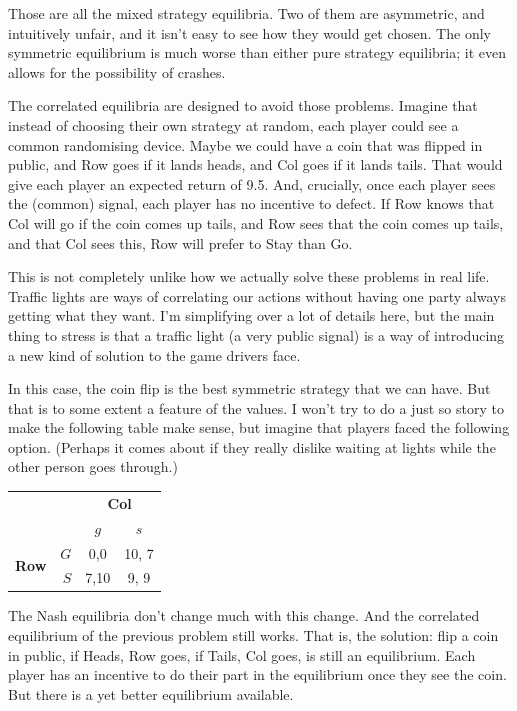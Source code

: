 \documentclass[openany]{book}
\begin{document}
Those are all the mixed strategy equilibria. Two of them are asymmetric, and intuitively unfair, and it isn't easy to see how they would get chosen. The only symmetric equilibrium is much worse than either pure strategy equilibria; it even allows for the possibility of crashes.

The correlated equilibria are designed to avoid those problems. Imagine that instead of choosing their own strategy at random, each player could see a common randomising device. Maybe we could have a coin that was flipped in public, and Row goes if it lands heads, and Col goes if it lands tails. That would give each player an expected return of 9.5. And, crucially, once each player sees the (common) signal, each player has no incentive to defect. If Row knows that Col will go if the coin comes up tails, and Row sees that the coin comes up tails, and that Col sees this, Row will prefer to Stay than Go.

This is not completely unlike how we actually solve these problems in real life. Traffic lights are ways of correlating our actions without having one party always getting what they want. I'm simplifying over a lot of details here, but the main thing to stress is that a traffic light (a very public signal) is a way of introducing a new kind of solution to the game drivers face.

In this case, the coin flip is the best symmetric strategy that we can have. But that is to some extent a feature of the values. I won't try to do a just so story to make the following table make sense, but imagine that players faced the following option. (Perhaps it comes about if they really dislike waiting at lights while the other person goes through.)

 \begin{center}
\begin{tabular}{l r | c c}
& & \multicolumn{2}{c}{\textbf{Col}} \\
& & $g$ & $s$  \\ \hline
\multirow{2}{*}{\textbf{Row}}
& $G$ & 0,0 & 10, 7 \\
& $S$ & 7,10 & 9, 9
\end{tabular}
\end{center}
The Nash equilibria don't change much with this change. And the correlated equilibrium of the previous problem still works. That is, the solution: flip a coin in public, if Heads, Row goes, if Tails, Col goes, is still an equilibrium. Each player has an incentive to do their part in the equilibrium once they see the coin. But there is a yet better equilibrium available.
\end{document}
